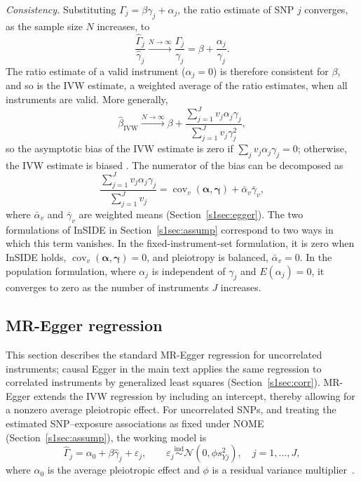 \noindent \textit{Consistency.} Substituting \(\Gamma_j=\beta\gamma_j+\alpha_j\), the ratio estimate of SNP \(j\) converges, as the sample size \(N\) increases, to
\begin{equation*}
\frac{\hat{\Gamma}_j}{\hat{\gamma}_j}
\xrightarrow{N\to\infty}
\frac{\Gamma_j}{\gamma_j}
=\beta+\frac{\alpha_j}{\gamma_j}.
\end{equation*}
The ratio estimate of a valid instrument (\(\alpha_j=0\)) is therefore consistent for \(\beta\), and so is the IVW estimate, a weighted average of the ratio estimates, when all instruments are valid. More generally,
\begin{equation*}
\hat{\beta}_{\mathrm{IVW}}
\xrightarrow{N\to\infty}
\beta+\frac{\sum_{j=1}^{J}v_j\alpha_j\gamma_j}{\sum_{j=1}^{J}v_j\gamma_j^2},
\end{equation*}
so the asymptotic bias of the IVW estimate is zero if \(\sum_{j}v_j\alpha_j\gamma_j=0\); otherwise, the IVW estimate is biased \cite{burgess2017interpreting}. The numerator of the bias can be decomposed as
\begin{equation*}
\frac{\sum_{j=1}^{J}v_j\alpha_j\gamma_j}{\sum_{j=1}^{J}v_j}
=\operatorname{cov}_v(\boldsymbol{\alpha},\boldsymbol{\gamma})+\bar{\alpha}_v\bar{\gamma}_v,
\end{equation*}
where $\bar{\alpha}_v$ and $\bar{\gamma}_v$ are weighted means (Section~\ref{s1sec:egger}). The two formulations of InSIDE in Section~\ref{s1sec:assump} correspond to two ways in which this term vanishes. In the fixed-instrument-set formulation, it is zero when InSIDE holds, $\operatorname{cov}_v(\boldsymbol{\alpha},\boldsymbol{\gamma})=0$, and pleiotropy is balanced, $\bar{\alpha}_v=0$. In the population formulation, where $\alpha_j$ is independent of $\gamma_j$ and $E(\alpha_j)=0$, it converges to zero as the number of instruments $J$ increases.

\subsection*{MR-Egger regression}
\label{s1sec:egger}

\noindent This section describes the standard MR-Egger regression for uncorrelated instruments; causal Egger in the main text applies the same regression to correlated instruments by generalized least squares (Section~\ref{s1sec:corr}). MR-Egger extends the IVW regression by including an intercept, thereby allowing for a nonzero average pleiotropic effect. For uncorrelated SNPs, and treating the estimated SNP--exposure associations as fixed under NOME (Section~\ref{s1sec:assump}), the working model is
\begin{equation*}
\hat{\Gamma}_j
=
\alpha_0+\beta\hat{\gamma}_j+\varepsilon_j,
\qquad
\varepsilon_j
\stackrel{\mathrm{ind}}{\sim}
\mathcal{N}(0,\phi s_{Yj}^{2}),
\quad j=1,\ldots,J,
\end{equation*}
where $\alpha_0$ is the average pleiotropic effect and $\phi$ is a residual variance multiplier~\cite{burgess2017interpreting}.

